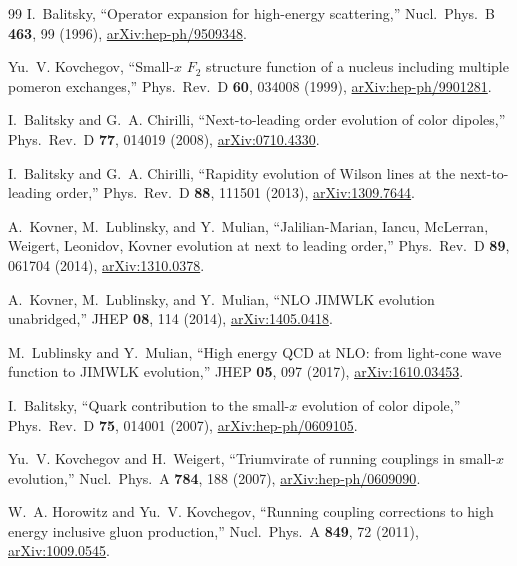 \documentclass[aps,prd,onecolumn,superscriptaddress,nofootinbib,floatfix,longbibliography,11pt]{revtex4-2}
\numberwithin{equation}{section}
\begin{document}
\begin{thebibliography}{99}
I.~Balitsky, ``Operator expansion for high-energy scattering,'' Nucl.\ Phys.\ B \textbf{463}, 99 (1996), \href{https://arxiv.org/abs/hep-ph/9509348}{arXiv:hep-ph/9509348}.

Yu.~V. Kovchegov, ``Small-$x$ $F_2$ structure function of a nucleus including multiple pomeron exchanges,'' Phys.\ Rev.\ D \textbf{60}, 034008 (1999), \href{https://arxiv.org/abs/hep-ph/9901281}{arXiv:hep-ph/9901281}.

I.~Balitsky and G.~A. Chirilli, ``Next-to-leading order evolution of color dipoles,'' Phys.\ Rev.\ D \textbf{77}, 014019 (2008), \href{https://arxiv.org/abs/0710.4330}{arXiv:0710.4330}.

I.~Balitsky and G.~A. Chirilli, ``Rapidity evolution of Wilson lines at the next-to-leading order,'' Phys.\ Rev.\ D \textbf{88}, 111501 (2013), \href{https://arxiv.org/abs/1309.7644}{arXiv:1309.7644}.

A.~Kovner, M.~Lublinsky, and Y.~Mulian, ``Jalilian-Marian, Iancu, McLerran, Weigert, Leonidov, Kovner evolution at next to leading order,'' Phys.\ Rev.\ D \textbf{89}, 061704 (2014), \href{https://arxiv.org/abs/1310.0378}{arXiv:1310.0378}.

A.~Kovner, M.~Lublinsky, and Y.~Mulian, ``NLO JIMWLK evolution unabridged,'' JHEP \textbf{08}, 114 (2014), \href{https://arxiv.org/abs/1405.0418}{arXiv:1405.0418}.

M.~Lublinsky and Y.~Mulian, ``High energy QCD at NLO: from light-cone wave function to JIMWLK evolution,'' JHEP \textbf{05}, 097 (2017), \href{https://arxiv.org/abs/1610.03453}{arXiv:1610.03453}.

I.~Balitsky, ``Quark contribution to the small-$x$ evolution of color dipole,'' Phys.\ Rev.\ D \textbf{75}, 014001 (2007), \href{https://arxiv.org/abs/hep-ph/0609105}{arXiv:hep-ph/0609105}.

Yu.~V. Kovchegov and H.~Weigert, ``Triumvirate of running couplings in small-$x$ evolution,'' Nucl.\ Phys.\ A \textbf{784}, 188 (2007), \href{https://arxiv.org/abs/hep-ph/0609090}{arXiv:hep-ph/0609090}.

W.~A. Horowitz and Yu.~V. Kovchegov, ``Running coupling corrections to high energy inclusive gluon production,'' Nucl.\ Phys.\ A \textbf{849}, 72 (2011), \href{https://arxiv.org/abs/1009.0545}{arXiv:1009.0545}.


\end{thebibliography}
\end{document}
